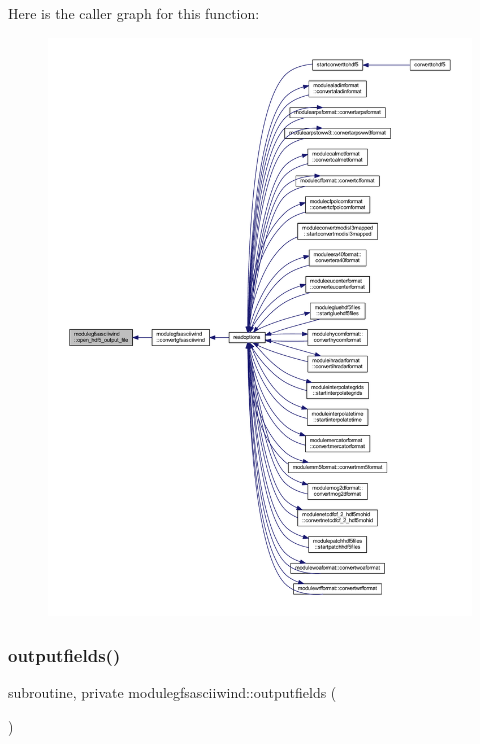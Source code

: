 Here is the caller graph for this function\+:\nopagebreak
\begin{figure}[H]
\begin{center}
\leavevmode
\includegraphics[width=350pt]{namespacemodulegfsasciiwind_ac0e8ece9bfc11aa5ca290d333ad96a29_icgraph}
\end{center}
\end{figure}
\mbox{\label{namespacemodulegfsasciiwind_ab51247b85cb09b0446fe50076953724a}} 
\subsubsection{\texorpdfstring{outputfields()}{outputfields()}}
{\footnotesize\ttfamily subroutine, private modulegfsasciiwind\+::outputfields (\begin{DoxyParamCaption}{ }\end{DoxyParamCaption})\hspace{0.3cm}{\ttfamily [private]}}

